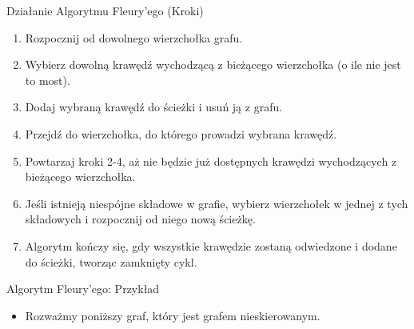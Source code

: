 \documentclass[polish,envcountsect,10pt]{beamer}
\begin{document}
\begin{frame}{Działanie Algorytmu Fleury'ego (Kroki)}
    \begin{enumerate}
        \item Rozpocznij od dowolnego wierzchołka grafu.
        \item Wybierz dowolną krawędź wychodzącą z bieżącego wierzchołka (o ile nie jest to most).
        \item Dodaj wybraną krawędź do ścieżki i usuń ją z grafu.
        \item Przejdź do wierzchołka, do którego prowadzi wybrana krawędź.
        \item Powtarzaj kroki 2-4, aż nie będzie już dostępnych krawędzi wychodzących z bieżącego wierzchołka.
        \item Jeśli istnieją niespójne składowe w grafie, wybierz wierzchołek w jednej z tych składowych i rozpocznij od niego nową ścieżkę.
        \item Algorytm kończy się, gdy wszystkie krawędzie zostaną odwiedzone i dodane do ścieżki, tworząc zamknięty cykl.
    \end{enumerate}
\end{frame}

\begin{frame}{Algorytm Fleury'ego: Przykład}
    \begin{itemize}
          \item Rozważmy poniższy graf, który jest grafem nieskierowanym.
    \end{itemize}
    \begin{center}
    \end{center}
\end{frame}
    
\end{document}
